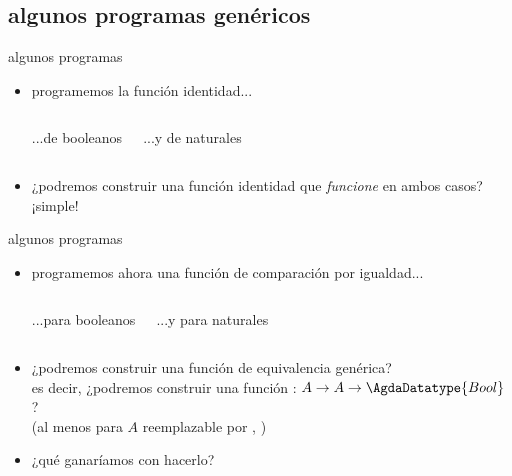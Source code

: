 \documentclass[9pt]{beamer}
\newcommand{\saltar}{\vspace{1ex}}
\begin{document}
\subsection{algunos programas gen\'ericos}
\begin{frame}[fragile]{algunos programas}
  \begin{itemize}
  \item programemos la función identidad...
    \pause
    \begin{columns}[T,onlytextwidth]
      \begin{block}{...de booleanos}
      \end{block}
      \pause
      \begin{block}{...y de naturales}
      \end{block}
      \pause
    \end{columns}
  \item ¿podremos construir una función identidad que {\it funcione} en ambos casos?\\ \saltar
    \pause
    ¡simple!\\
  \end{itemize}
\end{frame}

\begin{frame}{algunos programas}
  \begin{itemize}
  \item programemos ahora una función de comparación por igualdad...
    \pause
    \begin{columns}[T,onlytextwidth]
      \begin{block}{...para booleanos}
      \end{block}
      \pause
      \begin{block}{...y para naturales}
      \end{block}
      \pause
    \end{columns}
  \item ¿podremos construir una función de equivalencia \alert{genérica}?\\
    es decir, ¿podremos construir una función  : $A \to A \to \AgdaDatatype{Bool}$?\\ \vspace{-0.3ex}
    {\hspace{5ex}\small (al menos para $A$ reemplazable por , )}
    \pause
  \item ¿qué ganaríamos con hacerlo?
  \end{itemize}
\end{frame}
\end{document}
